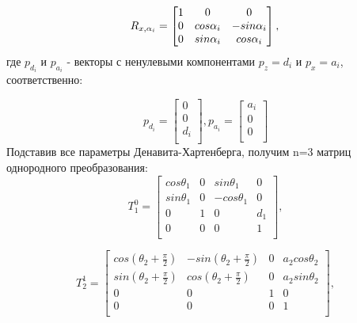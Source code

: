 \begin{equation*}\label{eq:model}
R_{x, \alpha_i} = 
     \begin{bmatrix}
    1 & 0 & 0\\
    0 & cos\alpha_i & -sin\alpha_i\\
    0 & sin\alpha_i & cos\alpha_i\\
    \end{bmatrix}
    , \\
\end{equation*} 
\hspace*{\parindent}где  $p_{d_i}$ и $p_{a_i}$ - векторы с ненулевыми компонентами $p_z= d_i$ и $p_x= a_i$, соответственно:

\begin{equation*}\label{eq:model}
 p_{d_i} = 
     \begin{bmatrix}
   0\\
   0\\
   d_i\\
    \end{bmatrix}
, p_{a_i} =
     \begin{bmatrix}
   a_i\\
   0\\
   0\\
    \end{bmatrix}
\end{equation*}
\hspace*{\parindent}Подставив все параметры Денавита-Хартенберга, получим n=3 матриц однородного преобразования:\\

\begin{equation*}\label{eq:model}
T_1^0 = 
     \begin{bmatrix}
    cos{\theta_1} & 0 &  sin{\theta_1} & 0 \\
    sin{\theta_1} & 0 &  -cos{\theta_1} & 0 \\
    0 & 1 & 0 & d_1\\
    0 & 0 & 0 & 1\\
    \end{bmatrix}
    ,
\end{equation*} 

\begin{equation*}\label{eq:model}
T_2^1 = 
     \begin{bmatrix}
    cos{(\theta_2 + \frac{\pi}{2})} & -sin{(\theta_2 + \frac{\pi}{2})} & 0 & a_2 cos{\theta_2} \\
    sin{(\theta_2 + \frac{\pi}{2})} & cos{(\theta_2 + \frac{\pi}{2})} & 0 & a_2 sin{\theta_2}\\
    0 & 0 & 1 & 0\\
    0 & 0 & 0 & 1\\
    \end{bmatrix}
    ,
\end{equation*} 

